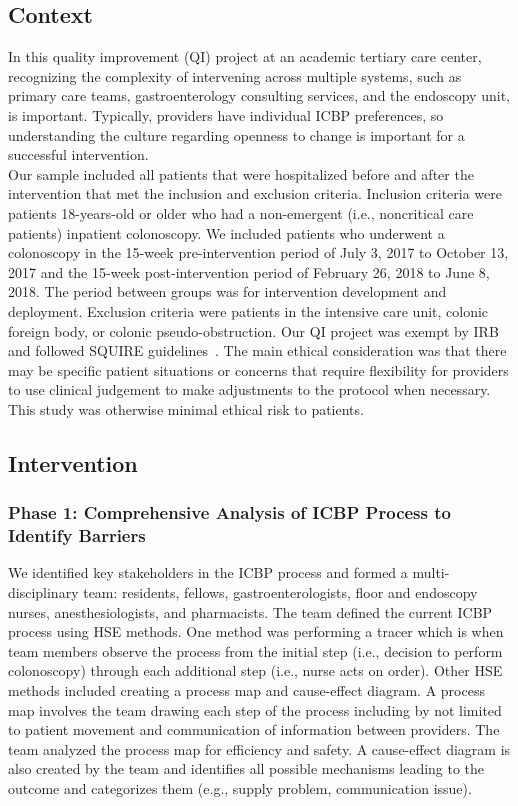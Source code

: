 \documentclass[Bprep]{subfiles}
\begin{document}
\subsection{Context}\label{subsec:Context}

In this quality improvement (QI) project at an academic tertiary care center, recognizing the complexity of intervening across multiple systems, such as primary care teams, gastroenterology consulting services, and the endoscopy unit, is important. Typically, providers have individual ICBP preferences, so understanding the culture regarding openness to change is important for a successful intervention.\\

Our sample included all patients that were hospitalized before and after the intervention that met the inclusion and exclusion criteria. Inclusion criteria were patients 18-years-old or older who had a non-emergent (i.e., noncritical care patients) inpatient colonoscopy. We included patients who underwent a colonoscopy in the 15-week pre-intervention period of July 3, 2017 to October 13, 2017 and the 15-week post-intervention period of February
26, 2018 to June 8, 2018. The period between groups was for intervention development and deployment. Exclusion criteria were patients in the intensive care unit, colonic foreign body, or colonic pseudo-obstruction. Our QI project was exempt by IRB and followed SQUIRE guidelines~\cite{Ogrinc2016-yz}. The main ethical consideration was that there may be specific patient situations or concerns that require flexibility for providers to use clinical judgement to make adjustments to the protocol when necessary. This study was otherwise minimal ethical risk to patients.\\

\subsection{Intervention}
\hypertarget{Intervention}{}
\subsubsection{Phase 1: Comprehensive Analysis of ICBP Process to Identify Barriers}\label{subsec:IntPhase1}

We identified key stakeholders in the ICBP process and formed a multi-disciplinary team: residents, fellows, gastroenterologists, floor and endoscopy nurses, anesthesiologists, and pharmacists. The team defined the current ICBP process using HSE methods. One method was performing a tracer which is when team members observe the process from the initial step (i.e., decision to perform colonoscopy) through each additional step (i.e., nurse acts on order). Other HSE methods included creating a process map and cause-effect diagram. A process map involves the team drawing each step of the process
including by not limited to patient movement and communication of information between providers. The team analyzed the process map for efficiency and safety. A cause-effect diagram is also created by the team and identifies all possible mechanisms leading to the outcome and categorizes them (e.g., supply problem, communication issue).\\
\end{document}
